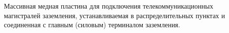 Массивная медная пластина для подключения
телекоммуникационных магистралей заземления, 
устанавливаемая в распределительных пунктах и
соединенная с главным (силовым) терминалом заземления.